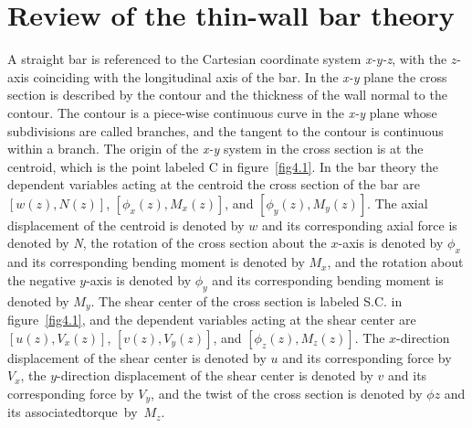 \documentclass{AeroStructure-ERJohnson}
\begin{document}
\newpage

\section{Review of the thin-wall bar theory}\label{sec4.1}

A straight bar is referenced to the Cartesian coordinate system \textit{x-y-z}, with the $z$-axis coinciding with the longitudinal axis of the bar. In the \textit{x-y} plane the cross section is described by the contour and the thickness of the wall normal to the contour. The contour is a piece-wise continuous curve in the \textit{x-y} plane whose subdivisions are called branches, and the tangent to the contour is continuous within a branch. The origin of the \textit{x-y} system in the cross section is at the centroid, which is the point labeled C in figure~\ref{fig4.1}. In the bar theory the dependent variables acting at the centroid the cross section of the bar are $[w(z), N(z)]$, $\left[\phi_{x}(z), M_{x}(z)\right]$, and $\left[\phi_{y}(z), M_{y}(z)\right]$. The axial displacement of the centroid is denoted by $w$ and its corresponding axial force is denoted by \textit{N}, the rotation of the cross section about the $x$-axis is denoted by $\phi_{x}$ and its corresponding bending moment is denoted by $M_{x}$, and the rotation about the negative $y$-axis is denoted by $\phi_{y}$ and its corresponding bending moment is denoted by $M_{y}$. The shear center of the cross section is labeled S.C. in figure~\ref{fig4.1}, and the dependent variables acting at the shear center are $\left[u(z), V_{x}(z)\right]$, $\left[v(z), V_{y}(z)\right]$, and $\left[\phi_{z}(z), M_{z}(z)\right]$. The $x$-direction displacement of the shear center is denoted by $u$ and its corresponding force by $V_{x}$, the $y$-direction displacement of the shear center is denoted by $v$ and its corresponding force by $V_{y}$, and the twist of the cross section is denoted by $\phi z$ and its associated\break torque~by~$M_{z}$.

{\def\thefigure{4.1}
}
\end{document}
